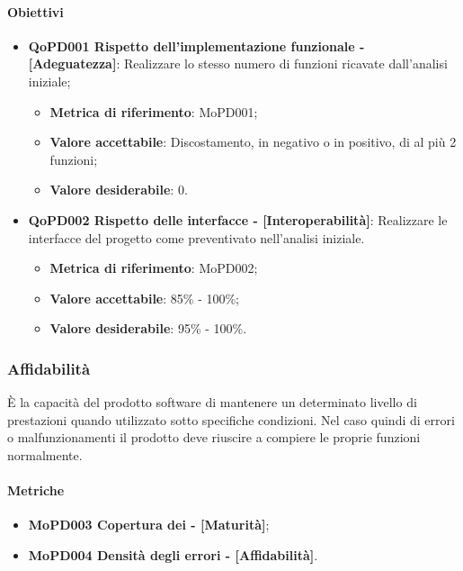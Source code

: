 \documentclass[../piano-di-qualifica.tex]{subfiles}
\begin{document}
\paragraph{Obiettivi}
\label{sub:obiettivi}
\begin{itemize}
    \item \textbf{QoPD001 Rispetto dell'implementazione funzionale - [Adeguatezza]}: Realizzare lo stesso numero di funzioni ricavate dall'analisi iniziale;
        \begin{itemize}
            \item \textbf{Metrica di riferimento}: MoPD001;
            \item \textbf{Valore accettabile}: Discostamento, in negativo o in positivo, di al più 2 funzioni;
            \item \textbf{Valore desiderabile}: 0.
        \end{itemize}
    \item \textbf{QoPD002 Rispetto delle interfacce - [Interoperabilità]}: Realizzare le interfacce del progetto come preventivato nell'analisi iniziale.
        \begin{itemize}
            \item \textbf{Metrica di riferimento}: MoPD002;
            \item \textbf{Valore accettabile}: 85\% - 100\%;
            \item \textbf{Valore desiderabile}: 95\% - 100\%.
        \end{itemize}
\end{itemize}

\subsubsection{Affidabilità}%
\label{sub:affidabilita}
È la capacità del prodotto software di mantenere un determinato livello di prestazioni quando utilizzato sotto specifiche condizioni.
Nel caso quindi di errori o malfunzionamenti il prodotto deve riuscire a compiere le proprie funzioni normalmente.

\paragraph{Metriche}
\label{sub:metriche}
\begin{itemize}
    \item \textbf{MoPD003 Copertura dei  - [Maturità]};
    \item \textbf{MoPD004 Densità degli errori - [Affidabilità]}.
\end{itemize}
\end{document}
